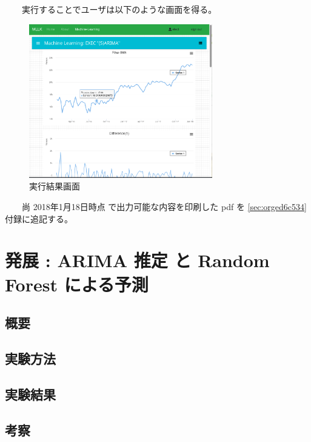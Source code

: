 \documentclass{scrartcl}
\begin{document}
　　実行することでユーザは以下のような画面を得る。\\
\begin{figure}[htbp]
\centering
\includegraphics[width=8cm]{./arima-view.PNG}
\caption{実行結果画面}
\end{figure}

　　尚 2018年1月18日時点 で出力可能な内容を印刷した pdf を \ref{sec:orged6c534} 付録に追記する。\\
\section{発展 : ARIMA 推定 と Random Forest による予測}
\label{sec:orga2d99a6}
\subsection{概要}
\label{sec:org9473873}
\subsection{実験方法}
\label{sec:org4dcbeba}
\subsection{実験結果}
\label{sec:orgb14227f}
\subsection{考察}
\label{sec:org84eaca2}
\end{document}
